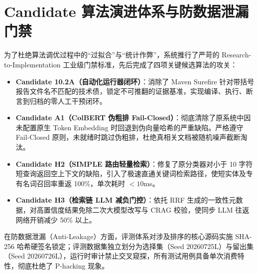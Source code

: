 \section{Candidate 算法演进体系与防数据泄漏门禁}

为了杜绝算法调优过程中的“过拟合”与“统计作弊”，系统推行了严苛的 Research-to-Implementation 工业级门禁标准，先后完成了四项关键候选算法的攻关：

\begin{itemize}
    \item \textbf{Candidate 10.2A（自动化运行器闭环）}：消除了 Maven Surefire 针对带括号报告文件名不匹配的技术债，锁定不可推翻的证据基准，实现编译、执行、断言到归档的零人工干预闭环。
    \item \textbf{Candidate A1（ColBERT 伪粗排 Fail-Closed）}：彻底清除了原系统中因未配置原生 Token Embedding 时回退到伪向量哈希的严重缺陷。严格遵守 Fail-Closed 原则，未就绪时跳过伪粗排，杜绝真相关文档被随机噪声截断淘汰。
    \item \textbf{Candidate H2（SIMPLE 路由轻量检索）}：修复了原分类器对小于 10 字符短查询返回空上下文的缺陷，引入了极速直通关键词检索路径，使短实体及专有名词召回率重返 100\%，单次耗时 $<10$ms。
    \item \textbf{Candidate H3（检索链 LLM 减负门控）}：依托 RRF 生成的一致性元数据，对高置信度结果免除二次大模型改写与 CRAG 校验，使同步 LLM 往返网络开销减少 50\% 以上。
\end{itemize}

在防数据泄漏（Anti-Leakage）方面，评测体系对涉及排序的核心源码实施 SHA-256 哈希硬签名锁定；评测数据集独立划分为选择集（Seed 20260725L）与留出集（Seed 20260726L），运行时审计禁止交叉窥探，所有测试用例具备单次消费特性，彻底杜绝了 P-hacking 现象。
